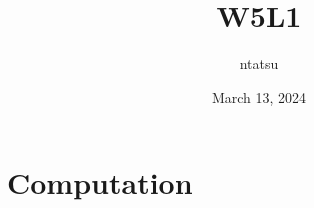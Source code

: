 \documentclass{article}
\title{W5L1}
\author{ntatsu}
\date{March 13, 2024}
\begin{document}
\maketitle

\section{Computation}
\end{document}
